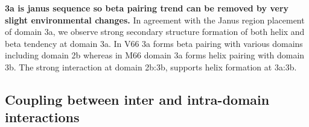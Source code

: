 \documentclass[journal=jacsat,manuscript=article]{achemso}
\begin{document}
\textbf{3a is janus sequence so beta pairing trend can be removed by very slight environmental changes.}
In agreement with the Janus region placement of domain 3a, we observe strong secondary structure formation of both helix and beta tendency at domain 3a. In V66 3a forms beta pairing with various domains including domain 2b whereas in M66 domain 3a forms helix pairing with domain 3b. The strong interaction at domain 2b:3b, supports helix formation at 3a:3b. 

 
%

	


\subsection{Coupling between inter and intra-domain interactions} 





\end{document}

